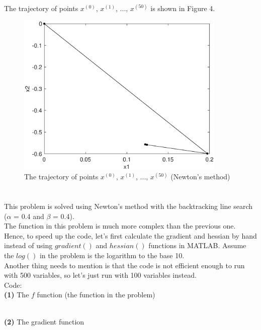 \documentclass[12pt]{article}
\begin{document}
\noindent The trajectory of points $x^{(0)}$, $x^{(1)}$, ..., $x^{(50)}$ is shown in Figure 4.

\begin{figure}[!htbp]
	\centering
	\includegraphics[width=10cm]{figures/fig4.eps}      
	\caption{The trajectory of points $x^{(0)}$, $x^{(1)}$, ..., $x^{(50)}$ (Newton's method)}
\end{figure}

\section{}

This problem is solved using Newton's method with the backtracking line search ($\alpha$ = 0.4 and $\beta$ = 0.4).\\

\noindent The function in this problem is much more complex than the previous one. Hence, to speed up the code, let's first calculate the gradient and hessian by hand instead of using $gradient()$ and $hessian()$ functions in MATLAB. Assume the $log()$ in the problem is the logarithm to the base 10.\\

\noindent Another thing needs to mention is that the code is not efficient enough to run with 500 variables, so let's just run with 100 variables instead.\\

\noindent Code:\\

\noindent\textbf{(1)} The $f$ function (the function in the problem)


\ \\

\bigskip\noindent\textbf{(2)}  The gradient function
\end{document}
